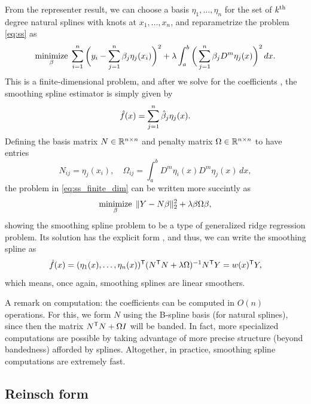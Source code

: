 \documentclass{article}
\begin{document}
From the representer result, we can choose a basis $\eta_1,\dots,\eta_n$ for the
set of $k^{\text{th}}$ degree natural splines with knots at $x_1,\dots,x_n$, and
reparametrize the problem \eqref{eq:ss} as  
\begin{equation}
\label{eq:ss_finite_dim}
\mathop{\mathrm{minimize}}_\beta \; \sum_{i=1}^n \bigg( y_i - \sum_{j=1}^n \beta_j \eta_j(x_i)
\bigg)^2 + \lambda \int_a^b \bigg( \sum_{j=1}^n \beta_j D^m \eta_j(x) \bigg)^2
\, dx.  
\end{equation}
This is a finite-dimensional problem, and after we solve for the coefficients
, the smoothing spline estimator is simply given by  
\[
\hat{f}(x)=\sum_{j=1}^n \hat{\beta}_j \eta_j(x).
\]
Defining the basis matrix $N \in \mathbb{R}^{n \times n}$ and penalty matrix $\Omega \in
\mathbb{R}^{n \times n}$ to have entries
\[
N_{ij} = \eta_j(x_i), \quad 
\Omega_{ij} = \int_a^b D^m \eta_i(x) D^m \eta_j(x) \, dx,
\]
the problem in \eqref{eq:ss_finite_dim} can be written more succintly as
\[
\mathop{\mathrm{minimize}}_\beta \; \|Y - N\beta\|_2^2 + \lambda \beta \Omega \beta,  
\]
showing the smoothing spline problem to be a type of generalized ridge
regression problem. Its solution has the explicit form , and thus, we can write the smoothing spline
as    
\[
\hat{f}(x) = (\eta_1(x),\dots,\eta_n(x))^{\mathsf{T}} (N^{\mathsf{T}} N + \lambda \Omega)^{-1} N^{\mathsf{T}} Y =
w(x)^{\mathsf{T}} Y,   
\]
which means, once again, smoothing splines are linear smoothers.

A remark on computation: the coefficients  can be computed in $O(n)$ operations. For this, we form  
$N$ using the B-spline basis (for natural splines), since then the matrix $N^{\mathsf{T}}
N + \Omega I$ will be banded. In fact, more specialized computations are
possible by taking advantage of more precise structure (beyond bandedness)
afforded by splines. Altogether, in practice, smoothing spline computations are 
extremely fast. 

\subsection{Reinsch form}
\end{document}
